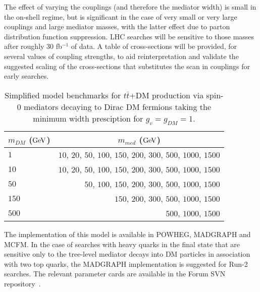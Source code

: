 \documentclass[a4,debug,notitlepage,nobib]{tufte-handout}
\newif\ifATLAS
\begin{document}
The effect of varying the couplings (and therefore the mediator width) 
is small in the on-shell regime, but is significant in the case of
very small or very large couplings and large mediator masses, 
with the latter effect due to parton distribution function suppression. 
LHC searches will be sensitive to those masses after roughly 30 fb$^{-1}$ of data. 
A table of cross-sections will be provided, for several values of coupling strengths,
to aid reinterpretation and validate the suggested scaling of the cross-sections
that substitutes the scan in couplings for early searches. 

\begin{table}[!ht]
\centering
\begin{tabular}{| l | r |}
\hline
\multicolumn{1}{|c|}{$m_{DM}$ (${\rm GeV}$)} & \multicolumn{1}{c|}{$m_{med}$ (${\rm GeV}$)} \\
\hline
 $1$    & $10$, $20$, $50$, $100$, $150$, $200$, $300$, $500$, $1000$, $1500$  \\
 $10$   & $10$, $20$, $50$, $100$, $150$, $200$, $300$, $500$, $1000$, $1500$  \\
 $50$   &             $50$, $100$, $150$, $200$, $300$, $500$, $1000$, $1500$  \\
 $150$  &                          $150$, $200$, $300$, $500$, $1000$, $1500$  \\
 $500$  &                                               $500$, $1000$, $1500$  \\
\hline
\end{tabular}
\caption{Simplified model benchmarks for $t\bar{t}$+DM production via spin-0 mediators decaying to Dirac DM fermions taking the minimum width presciption for $g_v = g_{DM} = 1$.}
\label{tab:ttdm_benchmarks}
\end{table}

The implementation of this model is available in POWHEG, MADGRAPH
and MCFM. In the case of searches with heavy quarks in the final state
that are sensitive only to the tree-level mediator decays into DM particles
in association with two top quarks, the MADGRAPH implementation is suggested
for Run-2 searches. The relevant parameter cards are available in the Forum 
SVN repository~\cite{ForumSVN_DMTTBar}.


\ifATLAS 
The ATLAS implementation of this model using on-the-fly Madgraph
will follow the MC15 pilot request for the monophoton D5 operator~\cite{ATLAS_PowhegPythiaMC15Test}. 
\fi
\end{document}

